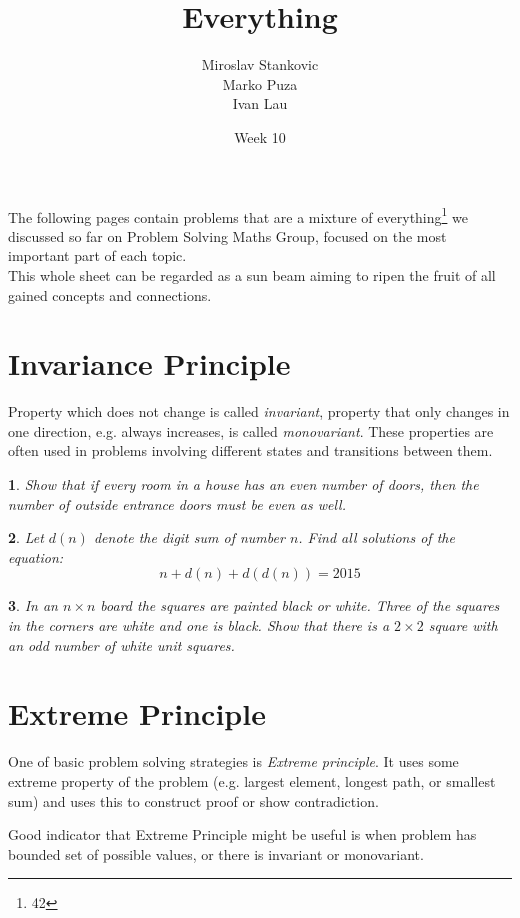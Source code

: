 \documentclass[12pt]{article}
\title{\textbf{Everything}}
\date{Week 10}
\author{Miroslav Stankovic\\ Marko Puza\\ Ivan Lau\\}
\newtheorem{problem}{}
\begin{document}
\maketitle

\noindent The following pages contain problems that are a mixture of everything\footnote{42} we discussed so far on Problem Solving Maths Group, focused on the most important part of each topic.\\
This whole sheet can be regarded as a sun beam aiming to ripen the fruit of all gained concepts and connections.

\section{Invariance Principle}
Property which does not change is called \emph{invariant}, property that only changes in one direction, e.g. always increases, is called \emph{monovariant}. These properties are often used in problems involving different states and transitions between them. 

\begin{problem}
Show that if every room in a house has an even number of doors,
then the number of outside entrance doors must be even as well.
 \end{problem}
 
\begin{problem}
Let $d(n)$ denote the digit sum of number $n$. Find all solutions of the equation: \[n + d(n) + d(d(n)) = 2015\]
\end{problem}

\begin{problem}
In an $n \times n$ board the squares are painted black or white. Three of the squares in the corners are white and one is black. Show that there is a $2 \times 2$ square with an odd number of white unit squares.
 \end{problem}

\section{Extreme Principle}

One of basic problem solving strategies is \emph{Extreme principle}. It uses some extreme property of the problem (e.g. largest element, longest path, or smallest sum) and uses this to construct proof or show contradiction. 

Good indicator that Extreme Principle might be useful is when problem has bounded set of possible values, or there is invariant or monovariant.
\end{document}
